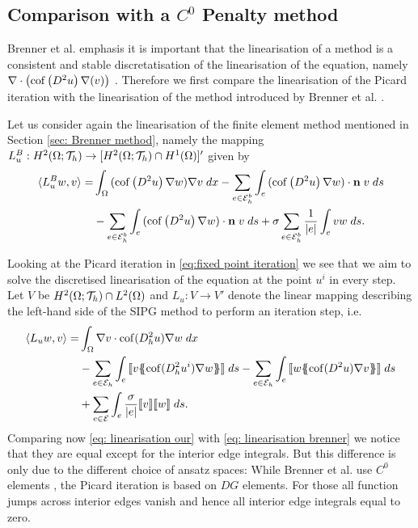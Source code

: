 \subsection{Comparison with a $C^0$ Penalty method}
Brenner et al. emphasis it is important that the linearisation of a \MA method is a consistent and stable discretatisation of the linearisation of the \MA equation, namely $\nabla \cdot \left( \operatorname{cof} \left( D^2 u  \right) \nabla (v) \right)$ \cite[Remark 2.2]{BGN+2011}.
Therefore we first compare the linearisation of the Picard iteration with the linearisation of the method introduced by Brenner et al. \cite{BGN+2011}.

Let us consider again the linearisation of the finite element method mentioned in Section \ref{sec: Brenner method}, namely the mapping $L^B_u:H^2(\Omega; \mathcal{T}_h) \rightarrow [H^2(\Omega; \mathcal{T}_h) \cap H^1(\Omega)]'$ given by
\begin{align}
 \langle L^B_{u} w, v \rangle
	=&\int_{\Omega} {{ (\operatorname{cof} \left( D^2  u \right)\nabla w) \nabla v}\;dx}
		- \sum_{e \in \mathcal{E}_h^b} \int_{e} {{ (\operatorname{cof} \left( D^2 u \right)\nabla w) \cdot \mathbf n \; v}\;ds} \nonumber \\
		&-  \sum_{e \in \mathcal{E}_h^b} \int_{e} {{ (\operatorname{cof} \left( D^2 u \right)\nabla w) \cdot \mathbf n \; v}\;ds} 
		+ \sigma \sum_{e \in \mathcal{E}_h^b} \frac 1 {|e|} \int_{e} {{ v w}\;ds}.
		\label{eq: linearisation brenner}
\end{align}


Looking at the Picard iteration in \eqref{eq:fixed point iteration} we see that we aim to solve the discretised linearisation of the \MA equation at the point $u^i$ in every step.\\
Let $V$ be $H^2(\Omega; \mathcal{T}_h) \cap L^2(\Omega)$ and $L_u: V \rightarrow V'$ denote the linear mapping describing the left-hand side of the SIPG method to perform an iteration step, i.e.
\begin{align}
	\bilin {L_u w} v =
 &\myIntX  \Omega { \nabla v \cdot \cof(D_h^2 u) \nabla w } \nonumber\\
 & -\sum\limits_{e \in \edges}\myIntS e { \jump {v \average { \cof(D_h^2 u^{i}) \nabla w} }}
 - \sum\limits_{e \in \edges}\myIntS e { \jump {w \average{ \cof(D^2 u) \nabla v} }} \nonumber\\  
 & +\sum\limits_{e \in \bigEps} \myIntS e { \frac \sigma {|e|} \jump {v}  \jump {w}}. \label{eq: linearisation our}
\end{align}
Comparing now \eqref{eq: linearisation our} with \eqref{eq: linearisation brenner} we notice that they are equal except for the interior edge integrals. But this difference is only due to the different choice of ansatz spaces: While Brenner et al. use $C^0$ elements \cite{BGN+2011}, the Picard iteration is based on $DG$ elements. For those all function jumps across interior edges vanish and hence all interior edge integrals equal to zero.

